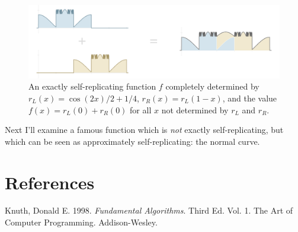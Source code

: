 \documentclass[20pt,]{extarticle}
\begin{document}
\begin{figure}
\centering
\includegraphics{images/nonplateau.png}
\caption{An exactly self-replicating function \(f\) completely
determined by \(r_L(x) = \cos(2x)/2 + 1/4\), \(r_R(x) = r_L(1 - x)\),
and the value \(f(x) = r_L(0) + r_R(0)\) for all \(x\) not determined by
\(r_L\) and \(r_R\).}\label{fig:nonplateau}
\end{figure}

Next I'll examine a famous function which is \emph{not} exactly
self-replicating, but which can be seen as approximately
self-replicating: the normal curve.

\section*{References}\label{references}

\hypertarget{refs}{}
\hypertarget{ref-taocp1}{}
Knuth, Donald E. 1998. \emph{Fundamental Algorithms}. Third Ed. Vol. 1.
The Art of Computer Programming. Addison-Wesley.
\end{document}
